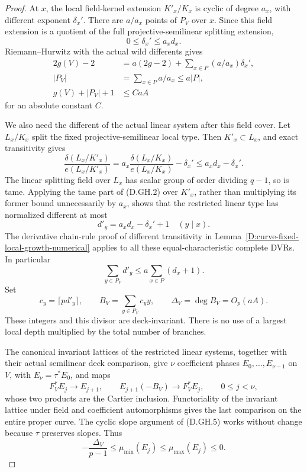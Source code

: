 \begin{proof}
At \(x\), the local field-kernel extension
\(K'_x/K_x\) is cyclic of degree \(a_x\), with
different exponent \(\delta_x'\). There are
\(a/a_x\) points of \(P_V\) over \(x\).
Since this field extension is a quotient of the full
projective-semilinear splitting extension,
\[
       0\le\delta_x'\le a_x d_x.
                                                        \tag{D.GS.6}
\]
Riemann--Hurwitz with the actual wild differents gives
\[
 \begin{aligned}
 2g(V)-2&=a(2g-2)+\sum_{x\in P}(a/a_x)\delta_x',\\
 |P_V|&=\sum_{x\in P}a/a_x\le a|P|,\\
 g(V)+|P_V|+1&\le C a A
 \end{aligned}                                         \tag{D.GS.7}
\]
for an absolute constant \(C\).

We also need the different of the actual linear
system after this field cover. Let \(L_x/K_x\)
split the fixed projective-semilinear local type.
Then \(K'_x\subset L_x\), and exact transitivity gives
\[
 \frac{\delta(L_x/K'_x)}{e(L_x/K'_x)}
 =a_x\frac{\delta(L_x/K_x)}{e(L_x/K_x)}-\delta_x'
 \le a_xd_x-\delta_x'.
                                                        \tag{D.GS.8}
\]
The linear splitting field over \(L_x\) has scalar
group of order dividing \(q-1\), so is tame. Applying
the tame part of (D.GH.2) over \(K'_x\), rather than
multiplying its former bound unnecessarily by \(a_x\),
shows that the restricted linear type has normalized
different at most
\[
             d'_y=a_xd_x-\delta_x'+1
                  \quad (y\mid x).
                                                        \tag{D.GS.9}
\]
The derivative chain-rule proof of different
transitivity in Lemma~\ref{D:curve-fixed-local-growth-numerical}
applies to all these equal-characteristic complete
DVRs. In particular
\[
 \sum_{y\in P_V}d'_y
       \le a\sum_{x\in P}(d_x+1).
                                                        \tag{D.GS.10}
\]
Set
\[
 c_y=\lceil p d'_y\rceil,\qquad
 B_V=\sum_{y\in P_V}c_y y,\qquad
 \Delta_V=\deg B_V=O_p(aA).
                                                        \tag{D.GS.11}
\]
These integers and this divisor are deck-invariant.
There is no use of a largest local depth multiplied
by the total number of branches.

The canonical invariant lattices of the restricted
linear systems, together with their actual semilinear
deck comparison, give \(\nu\) coefficient phases
\(E_0,\ldots,E_{\nu-1}\) on \(V\), with
\(E_\nu=\tau^*E_0\), and maps
\[
 F_V^*E_j\longrightarrow E_{j+1},\qquad
 E_{j+1}(-B_V)\longrightarrow F_V^*E_j,
              \qquad 0\le j<\nu,
                                                        \tag{D.GS.12}
\]
whose two products are the Cartier inclusion.
Functoriality of the invariant lattice under field
and coefficient automorphisms gives the last
comparison on the entire proper curve.
The cyclic slope argument of (D.GH.5) works without
change because \(\tau\) preserves slopes. Thus
\[
             -\frac{\Delta_V}{p-1}
                \le\mu_{\min}(E_j)
                \le\mu_{\max}(E_j)\le0.
                                                        \tag{D.GS.13}
\]


\end{proof}
